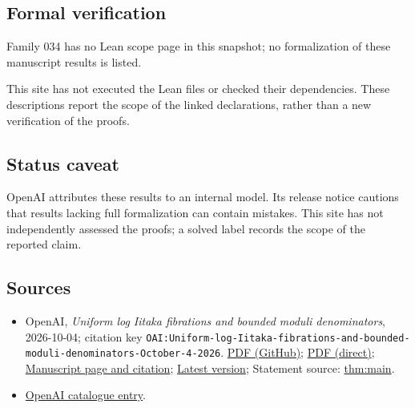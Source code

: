 \documentclass[11pt]{article}
\begin{document}
\subsection{Formal verification}
Family 034 has no Lean scope page in this snapshot; no formalization of these manuscript results is listed.

This site has not executed the Lean files or checked their dependencies. These descriptions report the scope of the linked declarations, rather than a new verification of the proofs.

\subsection{Status caveat}
OpenAI attributes these results to an internal model. Its release notice cautions that results lacking full formalization can contain mistakes. This site has not independently assessed the proofs; a solved label records the scope of the reported claim.

\subsection{Sources}
\begin{itemize}
\item OpenAI, \emph{Uniform log Iitaka fibrations and bounded moduli denominators}, 2026-10-04; citation key \texttt{OAI:Uniform-log-Iitaka-fibrations-and-bounded-moduli-denominators-October-4-2026}. \href{https://github.com/openai/math/blob/adc7f1241b42e322a6451854ab7e4b4c146bf78a/preprints/Uniform-log-Iitaka-fibrations-and-bounded-moduli-denominators-October-4-2026/uniform-log-iitaka.pdf}{PDF (GitHub)}; \href{https://github.com/openai/math/raw/adc7f1241b42e322a6451854ab7e4b4c146bf78a/preprints/Uniform-log-Iitaka-fibrations-and-bounded-moduli-denominators-October-4-2026/uniform-log-iitaka.pdf}{PDF (direct)}; \href{https://github.com/openai/math/blob/adc7f1241b42e322a6451854ab7e4b4c146bf78a/preprints/Uniform-log-Iitaka-fibrations-and-bounded-moduli-denominators-October-4-2026/README.md}{Manuscript page and citation}; \href{https://github.com/openai/math/blob/main/preprints/Uniform-log-Iitaka-fibrations-and-bounded-moduli-denominators-October-4-2026/uniform-log-iitaka.pdf}{Latest version}; Statement source: \href{https://github.com/openai/math/blob/adc7f1241b42e322a6451854ab7e4b4c146bf78a/preprints/Uniform-log-Iitaka-fibrations-and-bounded-moduli-denominators-October-4-2026/build/sections/introduction.tex\#L30}{thm:main}.
\item \href{https://github.com/openai/math/blob/adc7f1241b42e322a6451854ab7e4b4c146bf78a/CONTENTS.md}{OpenAI catalogue entry}.
\end{itemize}
\end{document}
